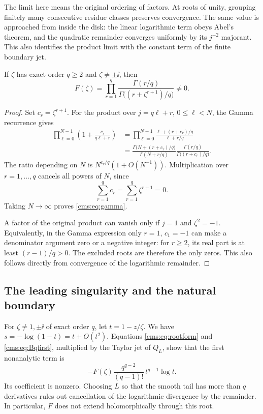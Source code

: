 The limit here means the original ordering of factors. At roots of unity, grouping finitely many consecutive residue classes preserves convergence. The same value is approached from inside the disk: the linear logarithmic term obeys Abel's theorem, and the quadratic remainder converges uniformly by its $j^{-2}$ majorant. This also identifies the product limit with the constant term of the finite boundary jet.

\begin{proposition}\label{cms:prop:gamma}
If $\zeta$ has exact order $q\geq2$ and $\zeta\ne\pm\ii$, then
\begin{equation}\label{cms:eq:gamma}
F(\zeta)=\prod_{r=1}^{q}
\frac{\Gamma(r/q)}{\Gamma\bigl((r+\zeta^{r+1})/q\bigr)}\ne0.
\end{equation}
\end{proposition}
\begin{proof}
Set $c_r=\zeta^{r+1}$. For the product over $j=q\ell+r$, $0\leq\ell<N$, the Gamma recurrence gives
\begin{align*}
\prod_{\ell=0}^{N-1}\left(1+\frac{c_r}{q\ell+r}\right)
&=\prod_{\ell=0}^{N-1}\frac{\ell+(r+c_r)/q}{\ell+r/q}\\
&=\frac{\Gamma\bigl(N+(r+c_r)/q\bigr)}{\Gamma(N+r/q)}
\frac{\Gamma(r/q)}{\Gamma\bigl((r+c_r)/q\bigr)}.
\end{align*}
The ratio depending on $N$ is $N^{c_r/q}(1+O(N^{-1}))$. Multiplication over $r=1,\ldots,q$ cancels all powers of $N$, since
\[
\sum_{r=1}^{q}c_r=\sum_{r=1}^{q}\zeta^{r+1}=0.
\]
Taking $N\to\infty$ proves \eqref{cms:eq:gamma}.

A factor of the original product can vanish only if $j=1$ and $\zeta^2=-1$. Equivalently, in the Gamma expression only $r=1$, $c_1=-1$ can make a denominator argument zero or a negative integer: for $r\geq2$, its real part is at least $(r-1)/q>0$. The excluded roots are therefore the only zeros. This also follows directly from convergence of the logarithmic remainder.
\end{proof}

\subsection{The leading singularity and the natural boundary}
For $\zeta\ne1,\pm\ii$ of exact order $q$, let $t=1-z/\zeta$. We have $s=-\log(1-t)=t+O(t^2)$. Equations \eqref{cms:eq:rootform} and \eqref{cms:eq:Bqfirst}, multiplied by the Taylor jet of $Q_L$, show that the first nonanalytic term is
\begin{equation}\label{cms:eq:rootleading}
-F(\zeta)\frac{q^{q-2}}{(q-1)!}\,
 t^{q-1}\log t.
\end{equation}
Its coefficient is nonzero. Choosing $L$ so that the smooth tail has more than $q$ derivatives rules out cancellation of the logarithmic divergence by the remainder. In particular, $F$ does not extend holomorphically through this root.


